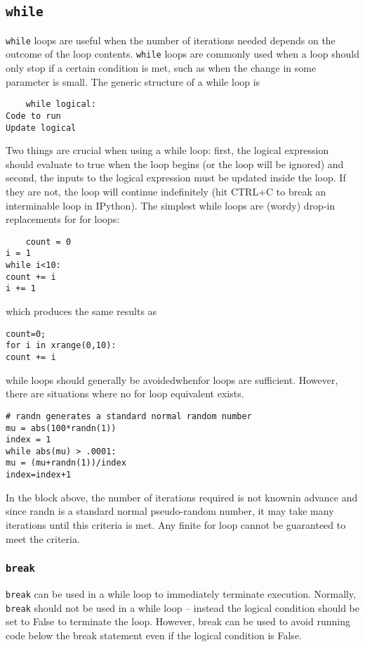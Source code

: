 \documentclass[Pydata.tex]{subfiles}
\begin{document}
\subsection{\texttt{while}}
\texttt{while} loops are useful when the number of iterations needed depends on the outcome of the loop contents.
\texttt{while} loops are commonly used when a loop should only stop if a certain condition is met, such as
when the change in some parameter is small. The generic structure of a while loop is
\begin{framed}
	\begin{verbatim}
	while logical:
Code to run
Update logical
\end{verbatim}
\end{framed}
Two things are crucial when using a while loop: first, the logical expression should evaluate to true
when the loop begins (or the loop will be ignored) and second, the inputs to the logical expression must
be updated inside the loop. If they are not, the loop will continue indefinitely (hit CTRL+C to break an
interminable loop in IPython). The simplest while loops are (wordy) drop-in replacements for for loops:
\begin{framed}
	\begin{verbatim}
	count = 0
i = 1
while i<10:
count += i
i += 1
\end{verbatim}
\end{framed}
which produces the same results as
\begin{framed}
	\begin{verbatim}
count=0;
for i in xrange(0,10):
count += i
\end{verbatim}
\end{framed}
while loops should generally be avoidedwhenfor loops are sufficient. However, there are situations where
no for loop equivalent exists.
\begin{framed}
\begin{verbatim}
# randn generates a standard normal random number
mu = abs(100*randn(1))
index = 1
while abs(mu) > .0001:
mu = (mu+randn(1))/index
index=index+1
\end{verbatim}
\end{framed}
In the block above, the number of iterations required is not knownin advance and since randn is a standard
normal pseudo-random number, it may take many iterations until this criteria is met. Any finite for loop
cannot be guaranteed to meet the criteria.
\subsubsection*{\texttt{break}}
\texttt{break} can be used in a while loop to immediately terminate execution. Normally,\texttt{ break} should not be
used in a while loop – instead the logical condition should be set to False to terminate the loop. However,
break can be used to avoid running code below the break statement even if the logical condition is False.
\end{document}
